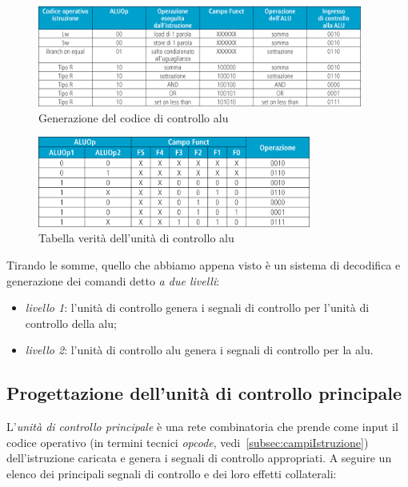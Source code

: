 \documentclass[class=book, crop=false, oneside]{standalone}
\begin{document}
\begin{figure}[H]
	\centering
	\includegraphics[width=0.95\textwidth,keepaspectratio]{riassunto_controllo_ALU.png}
	\caption{Generazione del codice di controllo \acrshort{alu}}
\end{figure}

\begin{figure}[H]
	\centering
	\includegraphics[width=0.80\textwidth,keepaspectratio]{tabella_verita_controllo_ALU.png}
	\caption{Tabella verità dell'unità di controllo \acrshort{alu}}
\end{figure}
Tirando le somme, quello che abbiamo appena visto è un sistema di decodifica e generazione dei comandi detto \emph{a due livelli}:
\begin{itemize}
	\item \emph{livello 1}: l'unità di controllo genera i segnali di controllo  per l'unità di controllo della \acrshort{alu};
	\item \emph{livello 2}: l'unità di controllo \acrshort{alu} genera i segnali di controllo per la \acrshort{alu}.
\end{itemize}

\subsection{Progettazione dell'unità di controllo principale}
L'\emph{unità di controllo principale} è una rete combinatoria che prende come input il codice operativo (in termini tecnici \emph{opcode}, vedi~\ref{subsec:campiIstruzione}) dell'istruzione caricata e genera i segnali di controllo appropriati. A seguire un elenco dei principali segnali di controllo e dei loro effetti collaterali:
\end{document}
